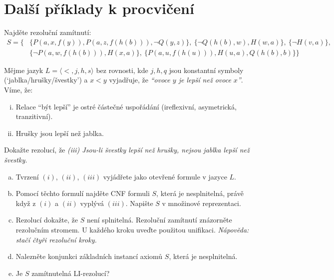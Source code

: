         
\section*{Další příklady k procvičení}


\begin{problem}
    Najděte rezoluční zamítnutí: 
    \begin{align*}
        S=\{
            &\{P(a,x,f(y)),P(a,z,f(h(b))),\neg Q(y,z)\},\
            \{\neg Q(h(b),w),H(w,a)\},\ 
            \{\neg H(v,a)\},\\
            &\{\neg P(a,w,f(h(b))),H(x,a)\},\
            \{P(a,u,f(h(u))),H(u,a),Q(h(b),b)\}            
        \}
    \end{align*}
   

\end{problem}


\begin{problem}

    Mějme jazyk $L=\langle <, j, h, s\rangle$ bez rovnosti, kde $j,h,q$ jsou konstantní symboly (`jablka/hrušky/švestky') a $x < y$ vyjadřuje, že {\it ``ovoce $y$ je lepší než ovoce $x$''}. Víme, že:
    \begin{enumerate}[(i)]\it
        \item Relace ``být lepší'' je ostré částečné uspořádání (ireflexivní, asymetrická, tranzitivní).
        \item Hrušky jsou lepší než jablka.
    \end{enumerate}
    Dokažte rezolucí, že \emph{(iii) Jsou-li švestky lepší než hrušky, nejsou jablka lepší než švestky.}

    \begin{enumerate}[(a)]
    \item Tvrzení $(i)$, $(ii)$, $(iii)$ vyjádřete jako otevřené formule v jazyce $L$.
    \item Pomocí těchto formulí najděte CNF formuli $S$, která je nesplnitelná, právě když z $(i)$ a $(ii)$ vyplývá $(iii)$. Napište $S$ v množinové reprezentaci.
    \item Rezolucí dokažte, že $S$ není splnitelná. Rezoluční zamítnutí znázorněte rezolučním stromem. U každého kroku uveďte použitou unifikaci. {\it Nápověda: stačí čtyři rezoluční kroky.}
    \item Nalezněte konjunkci základních instancí axiomů $S$, která je nesplnitelná.
    \item Je $S$ zamítnutelná LI-rezolucí?
    \end{enumerate}

\end{problem}


